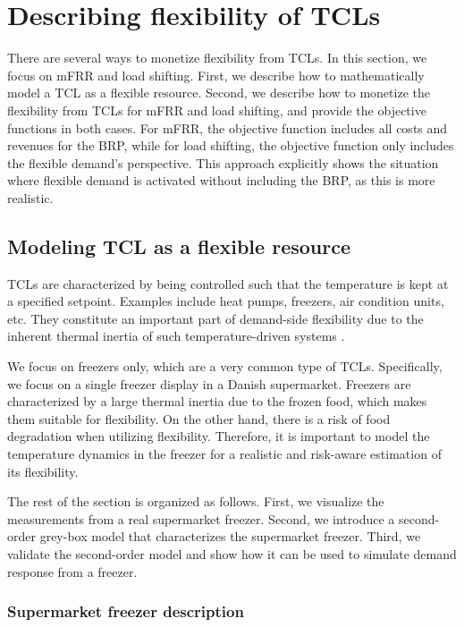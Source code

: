 \section{Describing flexibility of TCLs}\label{sec:monetizing_flex}

There are several ways to monetize flexibility from TCLs. In this section, we focus on mFRR and load shifting. First, we describe how to mathematically model a TCL as a flexible resource. Second, we describe how to monetize the flexibility from TCLs for mFRR and load shifting, and provide the objective functions in both cases. For mFRR, the objective function includes all costs and revenues for the BRP, while for load shifting, the objective function only includes the flexible demand's perspective. This approach explicitly shows the situation where flexible demand is activated without including the BRP, as this is more realistic.

\subsection{Modeling TCL as a flexible resource}
%
TCLs are characterized by being controlled such that the temperature is kept at a specified setpoint. Examples include heat pumps, freezers, air condition units, etc. They constitute an important part of demand-side flexibility due to the inherent thermal inertia of such temperature-driven systems \cite{hao2014aggregate}.

We focus on freezers only, which are a very common type of TCLs. Specifically, we focus on a single freezer display in a Danish supermarket. Freezers are characterized by a large thermal inertia due to the frozen food, which makes them suitable for flexibility. On the other hand, there is a risk of food degradation when utilizing flexibility. Therefore, it is important to model the temperature dynamics in the freezer for a realistic and risk-aware estimation of its flexibility.

The rest of the section is organized as follows. First, we visualize the measurements from a real supermarket freezer. Second, we introduce a second-order grey-box model that characterizes the supermarket freezer. Third, we validate the second-order model and show how it can be used to simulate demand response from a freezer.

\subsubsection{Supermarket freezer description}

